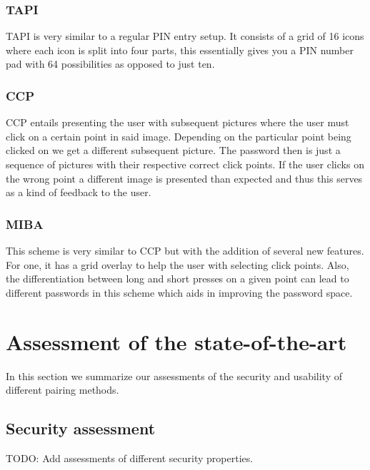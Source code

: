 \documentclass[conference, 11pt]{sty/IEEEtran}
\begin{document}
\subsubsection{TAPI}
\label{sssec:tapi}

TAPI is very similar to a regular PIN entry setup.
It consists of a grid of 16 icons where each icon is split into four parts, this essentially gives you a PIN number pad with 64 possibilities as opposed to just ten.

\subsubsection{CCP}
\label{sssec:ccp}

CCP entails presenting the user with subsequent pictures where the user must click on a certain point in said image.
Depending on the particular point being clicked on we get a different subsequent picture.
The password then is just a sequence of pictures with their respective correct click points.
If the user clicks on the wrong point a different image is presented than expected and thus this serves as a kind of feedback to the user.

\subsubsection{MIBA}
\label{sssec:miba}

This scheme is very similar to CCP but with the addition of several new features.
For one, it has a grid overlay to help the user with selecting click points.
Also, the differentiation between long and short presses on a given point can lead to different passwords in this scheme which aids in improving the password space.

\section{Assessment of the state-of-the-art}
\label{sec:assessment_of_the_state_of_the_art}

In this section we summarize our assessments of the security and usability of different pairing methods.

\subsection{Security assessment}
\label{ssec:security_assessment}

TODO: Add assessments of different security properties.
\end{document}
